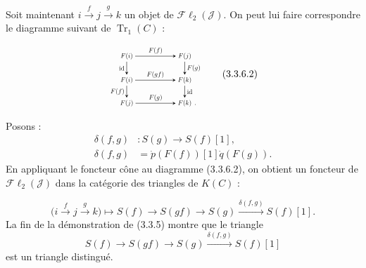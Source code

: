 \clearpage
{}%
\begingroup
\small
\setlength{\abovedisplayskip}{3pt plus 2pt minus 2pt}%
\setlength{\belowdisplayskip}{3pt plus 2pt minus 2pt}%
\setlength{\jot}{2pt}%
Soit maintenant
$i\xrightarrow{f}j\xrightarrow{g}k$ un objet de
$\mathcal{F}\ell_2(\mathcal{J})$. On peut lui faire correspondre le diagramme
suivant de $\operatorname{Tr}_1(C)$ :

\begin{equation}
\begin{tikzpicture}[>=stealth,baseline=(current bounding box.center),scale=0.66,
  every node/.style={transform shape}]
  \node (Fi1) at (0,2.55) {$F(i)$};
  \node (Fj1) at (3.15,2.55) {$F(j)$};
  \node (Fi2) at (0,1.25) {$F(i)$};
  \node (Fk1) at (3.15,1.25) {$F(k)$};
  \node (Fj2) at (0,0) {$F(j)$};
  \node (Fk2) at (3.15,0) {$F(k)$};
  \draw[->] (Fi1) -- node[above] {$F(f)$} (Fj1);
  \draw[->] (Fi2) -- node[above] {$F(gf)$} (Fk1);
  \draw[->] (Fj2) -- node[above] {$F(g)$} (Fk2);
  \draw[->] (Fi1) -- node[left] {$\mathrm{id}$} (Fi2);
  \draw[->] (Fj1) -- node[right] {$F(g)$} (Fk1);
  \draw[->] (Fi2) -- node[left] {$F(f)$} (Fj2);
  \draw[->] (Fk1) -- node[right] {$\mathrm{id}$} (Fk2);
  \node[anchor=base west,inner sep=0pt,xshift=.08em] at (Fk2.base east) {$.$};
\end{tikzpicture}
\tag{3.3.6.2}
\end{equation}

Posons :
\begin{equation}
\begin{aligned}
  \delta(f,g)&\colon S(g)\longrightarrow S(f)[1],\\
  \delta(f,g)&=\dot p(F(f))[1]\dot q(F(g)).
\end{aligned}
\tag{3.3.6.3}
\end{equation}
En appliquant le foncteur cône au diagramme (3.3.6.2), on obtient un foncteur
de $\mathcal{F}\ell_2(\mathcal{J})$ dans la catégorie des triangles de
$K(C)$ :

\begin{equation}
  \bigl(i\xrightarrow{f}j\xrightarrow{g}k\bigr)
  \longmapsto
  S(f)\longrightarrow S(gf)\longrightarrow S(g)
  \xrightarrow{\delta(f,g)}S(f)[1].
  \tag{3.3.6.4}
\end{equation}
La fin de la démonstration de (3.3.5) montre que le triangle
\[
  S(f)\longrightarrow S(gf)\longrightarrow S(g)
  \xrightarrow{\delta(f,g)}S(f)[1]
\]
est un triangle distingué.

